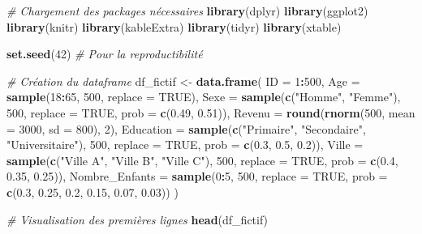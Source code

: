 \documentclass[
]{article}
\newenvironment{Shaded}{\begin{snugshade}}{\end{snugshade}}
\newcommand{\AttributeTok}[1]{\textcolor[rgb]{0.13,0.29,0.53}{#1}}
\newcommand{\CommentTok}[1]{\textcolor[rgb]{0.56,0.35,0.01}{\textit{#1}}}
\newcommand{\ConstantTok}[1]{\textcolor[rgb]{0.56,0.35,0.01}{#1}}
\newcommand{\DecValTok}[1]{\textcolor[rgb]{0.00,0.00,0.81}{#1}}
\newcommand{\FloatTok}[1]{\textcolor[rgb]{0.00,0.00,0.81}{#1}}
\newcommand{\FunctionTok}[1]{\textcolor[rgb]{0.13,0.29,0.53}{\textbf{#1}}}
\newcommand{\NormalTok}[1]{#1}
\newcommand{\OtherTok}[1]{\textcolor[rgb]{0.56,0.35,0.01}{#1}}
\newcommand{\SpecialCharTok}[1]{\textcolor[rgb]{0.81,0.36,0.00}{\textbf{#1}}}
\newcommand{\StringTok}[1]{\textcolor[rgb]{0.31,0.60,0.02}{#1}}
\begin{document}
\begin{Shaded}
\begin{Highlighting}[]
\CommentTok{\# Chargement des packages nécessaires}
\FunctionTok{library}\NormalTok{(dplyr)}
\FunctionTok{library}\NormalTok{(ggplot2)}
\FunctionTok{library}\NormalTok{(knitr)}
\FunctionTok{library}\NormalTok{(kableExtra)}
\FunctionTok{library}\NormalTok{(tidyr)}
\FunctionTok{library}\NormalTok{(xtable)}

\FunctionTok{set.seed}\NormalTok{(}\DecValTok{42}\NormalTok{)  }\CommentTok{\# Pour la reproductibilité}

\CommentTok{\# Création du dataframe}
\NormalTok{df\_fictif }\OtherTok{\textless{}{-}} \FunctionTok{data.frame}\NormalTok{(}
  \AttributeTok{ID =} \DecValTok{1}\SpecialCharTok{:}\DecValTok{500}\NormalTok{,}
  \AttributeTok{Age =} \FunctionTok{sample}\NormalTok{(}\DecValTok{18}\SpecialCharTok{:}\DecValTok{65}\NormalTok{, }\DecValTok{500}\NormalTok{, }\AttributeTok{replace =} \ConstantTok{TRUE}\NormalTok{),}
  \AttributeTok{Sexe =} \FunctionTok{sample}\NormalTok{(}\FunctionTok{c}\NormalTok{(}\StringTok{"Homme"}\NormalTok{, }\StringTok{"Femme"}\NormalTok{), }\DecValTok{500}\NormalTok{, }\AttributeTok{replace =} \ConstantTok{TRUE}\NormalTok{, }\AttributeTok{prob =} \FunctionTok{c}\NormalTok{(}\FloatTok{0.49}\NormalTok{, }\FloatTok{0.51}\NormalTok{)),}
  \AttributeTok{Revenu =} \FunctionTok{round}\NormalTok{(}\FunctionTok{rnorm}\NormalTok{(}\DecValTok{500}\NormalTok{, }\AttributeTok{mean =} \DecValTok{3000}\NormalTok{, }\AttributeTok{sd =} \DecValTok{800}\NormalTok{), }\DecValTok{2}\NormalTok{),}
  \AttributeTok{Education =} \FunctionTok{sample}\NormalTok{(}\FunctionTok{c}\NormalTok{(}\StringTok{"Primaire"}\NormalTok{, }\StringTok{"Secondaire"}\NormalTok{, }\StringTok{"Universitaire"}\NormalTok{), }\DecValTok{500}\NormalTok{, }\AttributeTok{replace =} \ConstantTok{TRUE}\NormalTok{, }\AttributeTok{prob =} \FunctionTok{c}\NormalTok{(}\FloatTok{0.3}\NormalTok{, }\FloatTok{0.5}\NormalTok{, }\FloatTok{0.2}\NormalTok{)),}
  \AttributeTok{Ville =} \FunctionTok{sample}\NormalTok{(}\FunctionTok{c}\NormalTok{(}\StringTok{"Ville A"}\NormalTok{, }\StringTok{"Ville B"}\NormalTok{, }\StringTok{"Ville C"}\NormalTok{), }\DecValTok{500}\NormalTok{, }\AttributeTok{replace =} \ConstantTok{TRUE}\NormalTok{, }\AttributeTok{prob =} \FunctionTok{c}\NormalTok{(}\FloatTok{0.4}\NormalTok{, }\FloatTok{0.35}\NormalTok{, }\FloatTok{0.25}\NormalTok{)),}
  \AttributeTok{Nombre\_Enfants =} \FunctionTok{sample}\NormalTok{(}\DecValTok{0}\SpecialCharTok{:}\DecValTok{5}\NormalTok{, }\DecValTok{500}\NormalTok{, }\AttributeTok{replace =} \ConstantTok{TRUE}\NormalTok{, }\AttributeTok{prob =} \FunctionTok{c}\NormalTok{(}\FloatTok{0.3}\NormalTok{, }\FloatTok{0.25}\NormalTok{, }\FloatTok{0.2}\NormalTok{, }\FloatTok{0.15}\NormalTok{, }\FloatTok{0.07}\NormalTok{, }\FloatTok{0.03}\NormalTok{))}
\NormalTok{)}

\CommentTok{\# Visualisation des premières lignes}
\FunctionTok{head}\NormalTok{(df\_fictif)}
\end{Highlighting}
\end{Shaded}
\end{document}
